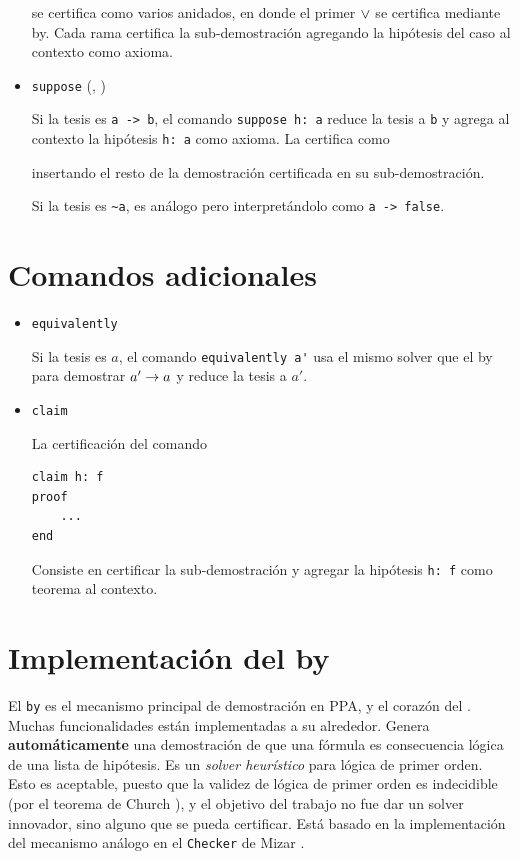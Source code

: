 \begin{itemize}
    se certifica como varios  anidados, en donde el primer $\vee$ se certifica mediante by. Cada rama certifica la sub-demostración agregando la hipótesis del caso al contexto como axioma.

    \proofTreeOrE

    \item \lstinline{suppose} (, )
    
    Si la tesis es \lstinline{a -> b}, el comando \lstinline{suppose h: a} reduce la tesis a \lstinline{b} y agrega al contexto la hipótesis \lstinline{h: a} como axioma. La certifica como

    \proofTreeImpI

    insertando el resto de la demostración certificada en su sub-demostración.

    Si la tesis es \lstinline{~a}, es análogo pero interpretándolo como \lstinline{a -> false}.

\end{itemize}

\section{Comandos adicionales}

\begin{itemize}
    \item \lstinline{equivalently}
    
    Si la tesis es $a$, el comando \lstinline{equivalently a'} usa el mismo solver que el by para demostrar $a' \to a$ y reduce la tesis a $a'$.

    \item \lstinline{claim}
    
    La certificación del comando
    \begin{lstlisting}[numbers=none]
claim h: f
proof
    ...
end
    \end{lstlisting}
    
    Consiste en certificar la sub-demostración y agregar la hipótesis \lstinline{h: f} como teorema al contexto.

\end{itemize}


\section{Implementación del by}

El \lstinline{by} es el mecanismo principal de demostración en PPA, y el corazón
del \modCertifier. Muchas funcionalidades están implementadas a su alrededor.
Genera \textbf{automáticamente} una demostración de que una fórmula es
consecuencia lógica de una lista de hipótesis. Es un \textit{solver heurístico} para lógica de primer orden. Esto es aceptable, puesto que la validez de lógica de primer orden es indecidible (por el teorema de Church \cite{church}), y el objetivo del trabajo no fue dar un solver innovador, sino alguno que se pueda certificar. Está basado en la implementación del mecanismo análogo en el \texttt{Checker} de Mizar \cite{freek-by}.


